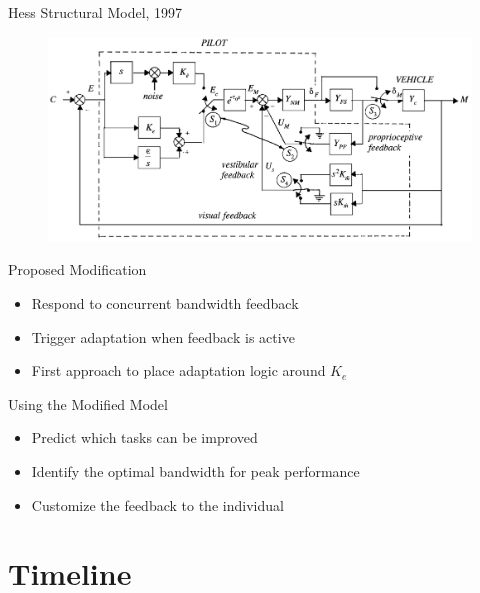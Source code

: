 \documentclass[10pt]{beamer}
\begin{document}
\begin{frame}[fragile]{Hess Structural Model, 1997~\cite{Hess1997}}
  \begin{figure}[h!]
    \begin{center}
      \includegraphics[width=\linewidth]{../img/Screen_Shot_2018-07-31_at_11.21.44_AM.png}
    \end{center}
  \end{figure}
\end{frame}

\begin{frame}[fragile]{Proposed Modification}
  \begin{itemize}
    \setlength\itemsep{1em}
    \item Respond to concurrent bandwidth feedback
    \item Trigger adaptation when feedback is active
    \item First approach to place adaptation logic around $K_e$
  \end{itemize}
\end{frame}

\begin{frame}[fragile]{Using the Modified Model}
  \begin{itemize}
    \setlength\itemsep{1em}
    \item Predict which tasks can be improved
    \item Identify the optimal bandwidth for peak performance
    \item Customize the feedback to the individual
  \end{itemize}
\end{frame}

\section{Timeline}
\end{document}
